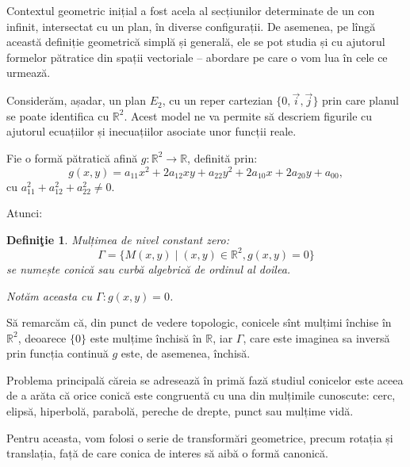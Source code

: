\documentclass[11pt,a4paper]{article}
\theoremstyle{dotless}
\theoremstyle{dotlessdr}
\newtheorem{definition}{Defini\c{t}ie}[section]
\begin{document}
Contextul geometric inițial a fost acela al secțiunilor determinate de un con
infinit, intersectat cu un plan, în diverse configurații. De asemenea, pe lîngă
această definiție geometrică simplă și generală, ele se pot studia și cu 
ajutorul formelor pătratice din spații vectoriale -- abordare pe care o vom lua
în cele ce urmează.

Considerăm, așadar, un plan $E_2$, cu un reper cartezian $\{0,\vec{i},\vec{j}\}$
prin care planul se poate identifica cu $\mathbb{R}^2$. Acest model ne va 
permite să descriem figurile cu ajutorul ecuațiilor și inecuațiilor asociate
unor funcții reale.

Fie o formă pătratică afină $g : \mathbb{R}^2 \to \mathbb{R}$, definită prin: 
 \[
	g(x,y) = a_{11} x^2 + 2a_{12}xy + a_{22}y^2 + 2a_{10}x + 2a_{20}y + a_{00},
\]
cu $a_{11}^2 + a_{12}^2 + a_{22}^2 \neq 0$.

Atunci:

\begin{definition}

	Mulțimea de nivel constant zero: 
 \[
    \Gamma = \{M(x,y) \mid (x,y) \in \mathbb{R}^2, g(x,y) = 0 \}
\]
se numește \emph{conică} sau \emph{curbă algebrică de ordinul al doilea}.

Notăm aceasta cu $\Gamma: g(x,y) = 0$.
\end{definition}

Să remarcăm că, din punct de vedere topologic, conicele sînt mulțimi închise
în $\mathbb{R}^2$, deoarece $\{0\}$ este mulțime închisă în $\mathbb{R}$, iar
$\Gamma$, care este imaginea sa inversă prin funcția continuă $g$ este, de
asemenea, închisă.

Problema principală căreia se adresează în primă fază studiul conicelor este 
aceea de a arăta că orice conică este congruentă cu una din mulțimile cunoscute:
cerc, elipsă, hiperbolă, parabolă, pereche de drepte, punct sau mulțime vidă.

Pentru aceasta, vom folosi o serie de transformări geometrice, precum rotația
și translația, față de care conica de interes să aibă o formă canonică.
\end{document}
